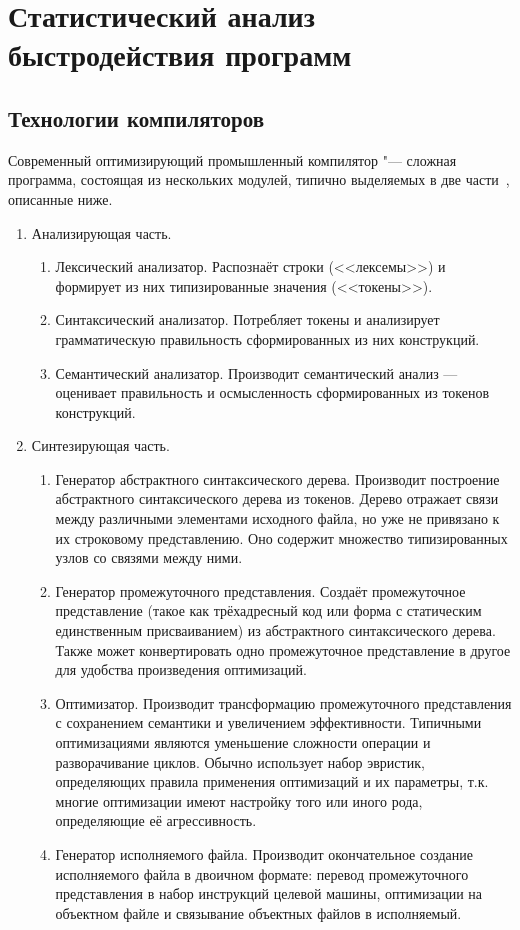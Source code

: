 \section{Статистический анализ быстродействия программ}
\subsection{Технологии компиляторов}
Современный оптимизирующий промышленный компилятор "--- сложная программа, состоящая из нескольких модулей, типично выделяемых в две части~\cite{Aho:2006:CPT:1177220}, описанные ниже.
\begin{enumerate}
	\item Анализирующая часть.
	\begin{enumerate}
		\item Лексический анализатор. Распознаёт строки (<<лексемы>>) и формирует из них типизированные значения (<<токены>>).
		\item Синтаксический анализатор. Потребляет токены и анализирует грамматическую правильность сформированных из них конструкций.
		\item Семантический анализатор. Производит семантический анализ --- оценивает правильность и осмысленность сформированных из токенов конструкций.
	\end{enumerate}
	\item Синтезирующая часть.
	\begin{enumerate}
		\item Генератор абстрактного синтаксического дерева. Производит построение абстрактного синтаксического дерева из токенов. Дерево отражает связи между различными элементами исходного файла, но уже не привязано к их строковому представлению. Оно содержит множество типизированных узлов со связями между ними.
		\item Генератор промежуточного представления. Создаёт промежуточное представление (такое как трёхадресный код или форма с статическим единственным присваиванием) из абстрактного синтаксического дерева. Также может конвертировать одно промежуточное представление в другое для удобства произведения оптимизаций.
		\item Оптимизатор. Производит трансформацию промежуточного представления с сохранением семантики и увеличением эффективности. Типичными оптимизациями являются уменьшение сложности операции и разворачивание циклов. Обычно использует набор эвристик, определяющих правила применения оптимизаций и их параметры, т.к. многие оптимизации имеют настройку того или иного рода, определяющие её агрессивность.
		\item Генератор исполняемого файла. Производит окончательное создание исполняемого файла в двоичном формате: перевод промежуточного представления в набор инструкций целевой машины, оптимизации на объектном файле и связывание объектных файлов в исполняемый.
	\end{enumerate}
\end{enumerate}

